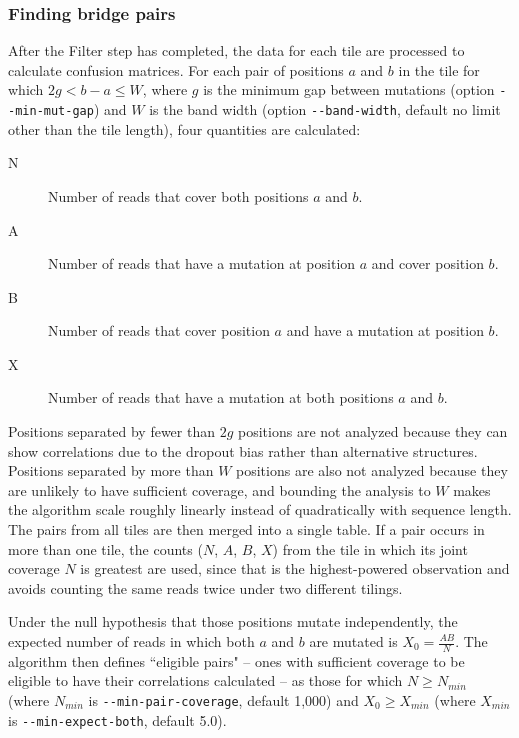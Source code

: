 \documentclass{article}
\begin{document}
\subsubsection{Finding bridge pairs}
\label{finding-bridge-pairs}

After the Filter step has completed, the data for each tile are processed to calculate confusion matrices.
For each pair of positions $a$ and $b$ in the tile for which $2g < b - a \le W$, where $g$ is the minimum gap between mutations (option \verb|--min-mut-gap|) and $W$ is the band width (option \verb|--band-width|, default no limit other than the tile length), four quantities are calculated:
\begin{description}
    \item[N] Number of reads that cover both positions $a$ and $b$.
    \item[A] Number of reads that have a mutation at position $a$ and cover position $b$.
    \item[B] Number of reads that cover position $a$ and have a mutation at position $b$.
    \item[X] Number of reads that have a mutation at both positions $a$ and $b$.
\end{description}
Positions separated by fewer than $2g$ positions are not analyzed because they can show correlations due to the dropout bias rather than alternative structures.
Positions separated by more than $W$ positions are also not analyzed because they are unlikely to have sufficient coverage, and bounding the analysis to $W$ makes the algorithm scale roughly linearly instead of quadratically with sequence length.
The pairs from all tiles are then merged into a single table.
If a pair occurs in more than one tile, the counts ($N$, $A$, $B$, $X$) from the tile in which its joint coverage $N$ is greatest are used, since that is the highest-powered observation and avoids counting the same reads twice under two different tilings.

Under the null hypothesis that those positions mutate independently, the expected number of reads in which both $a$ and $b$ are mutated is $X_0 = \frac{AB}{N}$.
The algorithm then defines ``eligible pairs" -- ones with sufficient coverage to be eligible to have their correlations calculated -- as those for which $N \ge N_{min}$ (where $N_{min}$ is \verb|--min-pair-coverage|, default 1,000) and $X_0 \ge X_{min}$ (where $X_{min}$ is \verb|--min-expect-both|, default 5.0).
\end{document}
